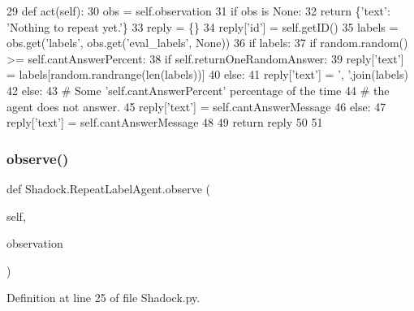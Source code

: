 \begin{DoxyCode}
29     \textcolor{keyword}{def }act(self):
30         obs = self.observation
31         \textcolor{keywordflow}{if} obs \textcolor{keywordflow}{is} \textcolor{keywordtype}{None}:
32          \textcolor{keywordflow}{return} \{\textcolor{stringliteral}{'text'}: \textcolor{stringliteral}{'Nothing to repeat yet.'}\}
33         reply = \{\}
34         reply[\textcolor{stringliteral}{'id'}] = self.getID()
35         labels = obs.get(\textcolor{stringliteral}{'labels'}, obs.get(\textcolor{stringliteral}{'eval\_labels'}, \textcolor{keywordtype}{None}))
36         \textcolor{keywordflow}{if} labels:
37          \textcolor{keywordflow}{if} random.random() >= self.cantAnswerPercent:
38              \textcolor{keywordflow}{if} self.returnOneRandomAnswer:
39                  reply[\textcolor{stringliteral}{'text'}] = labels[random.randrange(len(labels))]
40              \textcolor{keywordflow}{else}:
41                  reply[\textcolor{stringliteral}{'text'}] = \textcolor{stringliteral}{', '}.join(labels)
42          \textcolor{keywordflow}{else}:
43              \textcolor{comment}{# Some 'self.cantAnswerPercent' percentage of the time}
44              \textcolor{comment}{# the agent does not answer.}
45              reply[\textcolor{stringliteral}{'text'}] = self.cantAnswerMessage
46         \textcolor{keywordflow}{else}:
47          reply[\textcolor{stringliteral}{'text'}] = self.cantAnswerMessage
48 
49         \textcolor{keywordflow}{return} reply
50 
51 
\end{DoxyCode}
\mbox{\label{classShadock_1_1RepeatLabelAgent_ae01ff4d505267990982ec0565dccd61d}} 
\subsubsection{\texorpdfstring{observe()}{observe()}}
{\footnotesize\ttfamily def Shadock.\+Repeat\+Label\+Agent.\+observe (\begin{DoxyParamCaption}\item[{}]{self,  }\item[{}]{observation }\end{DoxyParamCaption})}



Definition at line 25 of file Shadock.\+py.


